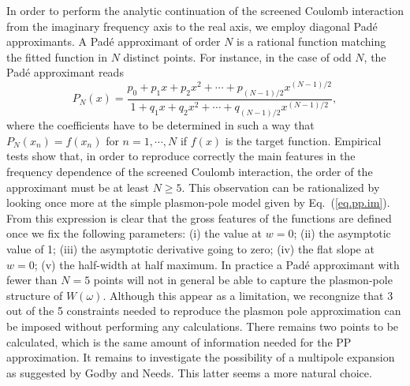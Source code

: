 \documentclass[twocolumn,prb,showpacs,superscriptaddress]{revtex4}
\def\w{\omega}
\begin{document}
In order to perform the analytic continuation of the screened Coulomb interaction
from the imaginary frequency axis to the real axis, we employ diagonal Pad\'e 
approximants.\cite{pade1,pade2,pade3}
A Pad\'e approximant of order $N$ is a rational function matching the fitted function
in $N$ distinct points. For instance, in the case of odd $N$, the Pad\'e approximant
reads
  \begin{equation}
  P_N(x) = \frac{p_0+p_1x+p_2x^2+\cdots+p_{(N-1)/2}x^{(N-1)/2}}{1+q_1x+q_2x^2+\cdots+q_{(N-1)/2}x^{(N-1)/2}},
  \end{equation}
where the coefficients have to be determined in such a way that $P_N(x_n)=f(x_n)$ for $n=1,\cdots,N$
if $f(x)$ is the target function.
Empirical tests show that, in order to reproduce correctly the main features in the 
frequency dependence of the screened Coulomb interaction, the order of the approximant
must be at least $N\ge5$.
This observation can be rationalized by looking once more at the simple plasmon-pole
model given by Eq.\ (\ref{eq.pp.im}). From this expression is clear that the gross
features of the functions are defined once we fix the following parameters:
(i) the value at $w=0$; (ii) the asymptotic value of 1; (iii) the asymptotic derivative
going to zero; (iv) the flat slope at $w=0$; (v) the half-width at half maximum.
In practice a Pad\'e approximant with fewer than $N=5$ points will not in general
be able to capture the plasmon-pole structure of $W(\w)$.
Although this appear as a limitation, we recongnize that 3 out of the 5 constraints
needed to reproduce the plasmon pole approximation can be imposed without performing
any calculations. There remains two points to be calculated, which is the same
amount of information needed for the PP approximation.
It remains to investigate the possibility of a multipole expansion as suggested
by Godby and Needs. This latter seems a more natural choice.
\end{document}
